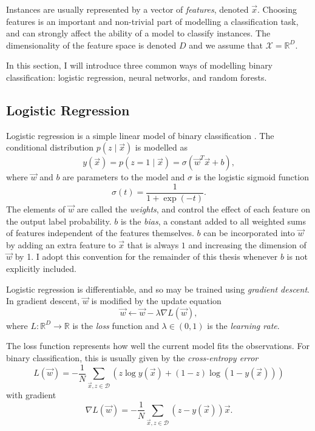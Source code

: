     Instances are usually represented by a vector of \emph{features}, denoted
    $\vec x$. Choosing features is an important and non-trivial part of
    modelling a classification task, and can strongly affect the ability of a
    model to classify instances. The dimensionality of the feature space is
    denoted $D$ and we assume that $\mathcal X = \mathbb{R}^D$.

    In this section, I will introduce three common ways of modelling binary
    classification: logistic regression, neural networks, and random forests.

    \subsection{Logistic Regression}
    \label{sec:logistic-regression}

        Logistic regression is a simple linear model of binary classification \citep{bishop06}.
        The conditional distribution $p(z \mid \vec x)$ is modelled as
        \[
            y(\vec x) = p(z = 1 \mid \vec x) = \sigma(\vec w^T \vec x + b),
        \]
        where $\vec w$ and $b$ are parameters to the model and $\sigma$ is the
        logistic sigmoid function
        \[
            \sigma(t) = \frac{1}{1 + \exp(-t)}.
        \]
        The elements of $\vec w$ are called the \emph{weights}, and control the
        effect of each feature on the output label probability. $b$ is the
        \emph{bias}, a constant added to all weighted sums of features
        independent of the features themselves. $b$ can be incorporated into
        $\vec w$ by adding an extra feature to $\vec x$ that is always $1$ and
        increasing the dimension of $\vec w$ by 1. I adopt this convention for
        the remainder of this thesis whenever $b$ is not explicitly included.

        Logistic regression is differentiable, and so may be trained using
        \emph{gradient descent}. In gradient descent, $\vec w$ is modified by
        the update equation
        \[
            \vec w \leftarrow \vec w - \lambda \nabla L(\vec w),
        \]
        where $L : \mathbb{R}^D \to \mathbb{R}$ is the \emph{loss} function and
        $\lambda \in (0, 1)$ is the \emph{learning rate}.

        The loss function represents how well the current model fits the
        observations. For binary classification, this is usually given by the
        \emph{cross-entropy error} \citep{bishop06}
        \[
            L(\vec w) = -\frac{1}{N} \sum_{\vec x, z \in \mathcal D} \left(
                z \log y(\vec x) + (1 - z) \log (1 - y(\vec x))
            \right)
        \]
        with gradient
        \[
            \nabla L(\vec w) = -\frac{1}{N}
                \sum_{\vec x, z \in \mathcal D} \left(z - y(\vec x)\right) \vec x.
        \]

